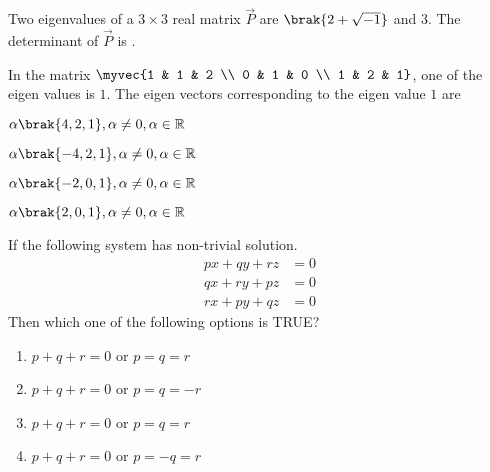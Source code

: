 		\item Two eigenvalues of a $3 \times 3$ real matrix $\vec{P}$ are $\brak{2 + \sqrt{-1}}$ and $3$. The determinant of $\vec{P}$ is \underline{\hspace{2cm}}.
		\hfill{}
		\item In the matrix $\myvec{1 & 1 & 2 \\ 0 & 1 & 0 \\ 1 & 2 & 1}$, one of the eigen values is $1$. The eigen vectors corresponding to the eigen value $1$ are
		\hfill{}
		\begin{enumerate}
		\end{enumerate}
		\item If the following system has non-trivial solution.
		\begin{align*}
			px + qy + rz &= 0\\
			qx + ry + pz &= 0\\
			rx + py + qz &= 0
		\end{align*}
		Then which one of the following options is TRUE?
		\hfill{\brak{\text{CS 2016}}}
			\begin{multicols}{2}
		\begin{enumerate}
			\item $p + q + r = 0$ or $p = q = r$
			\item $p + q + r = 0$ or $p = q = -r$
			\item $p + q + r = 0$ or $p = q = r$
			\item $p + q + r = 0$ or $p = -q = r$
		\end{enumerate}
	\end{multicols}
